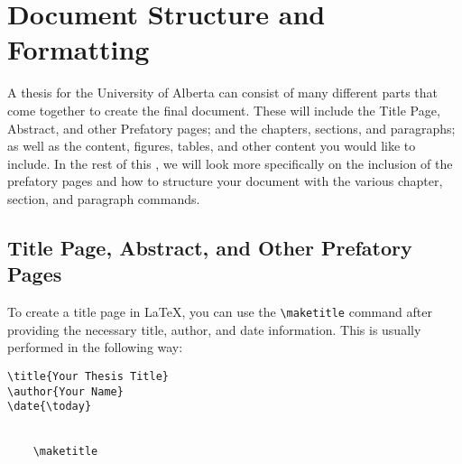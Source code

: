 \chapter{Document Structure and Formatting}\label{ch:documentstructure}
	A thesis for the University of Alberta can consist of many different parts that come together to create the final document.
	These will include the Title Page, Abstract, and other Prefatory pages; and the chapters, sections, and paragraphs; as well as the content, figures, tables, and other content you would like to include.
	In the rest of this , we will look more specifically on the inclusion of the prefatory pages and how to structure your document with the various chapter, section, and paragraph commands.
	
	\section{Title Page, Abstract, and Other Prefatory Pages}
		To create a title page in \LaTeX, you can use the \lstinline|\maketitle| command after providing the necessary title, author, and date information. 
		This is usually performed in the following way:

		\begin{lstlisting}[style=LaTeXStyle]
\title{Your Thesis Title}
\author{Your Name}
\date{\today}


	\maketitle

		\end{lstlisting}

